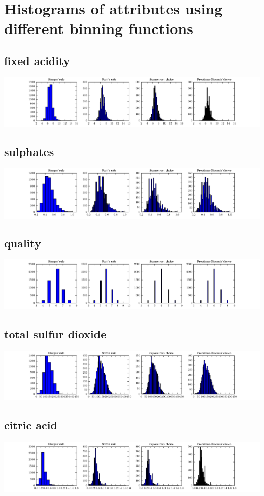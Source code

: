 \documentclass{report}
\begin{document}
\section{Histograms of attributes using different binning functions}

\subsection{fixed acidity}
\includegraphics{histograms/fixed_acidity.pdf}

\subsection{sulphates}
\includegraphics{histograms/sulphates.pdf}

\subsection{quality}
\includegraphics{histograms/quality.pdf}

\subsection{total sulfur dioxide}
\includegraphics{histograms/total_sulfur_dioxide.pdf}

\subsection{citric acid}
\includegraphics{histograms/citric_acid.pdf}
\end{document}

